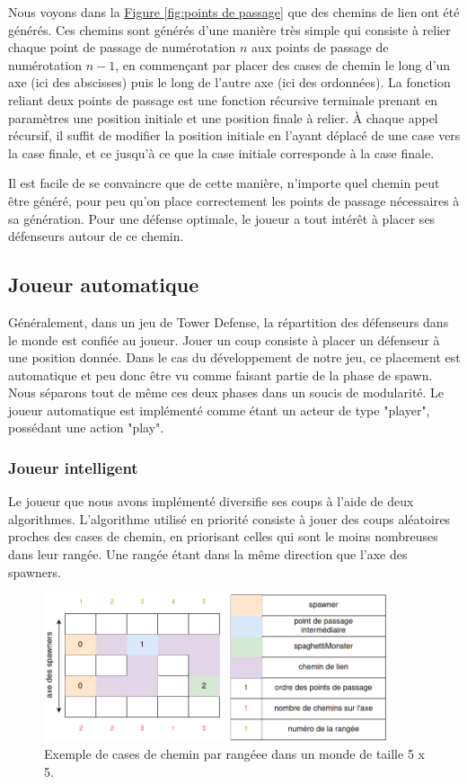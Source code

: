 \documentclass{article}
\begin{document}
Nous voyons dans la \hyperref[fig:points de passage]{Figure \ref{fig:points de passage}} que des chemins de lien ont été générés. Ces chemins sont générés d'une manière très simple qui consiste à relier chaque point de passage de numérotation $n$ aux points de passage de numérotation $n - 1$, en commençant par placer des cases de chemin le long d'un axe (ici des abscisses) puis le long de l'autre axe (ici des ordonnées). La fonction reliant deux points de passage est une fonction récursive terminale prenant en paramètres une position initiale et une position finale à relier. À chaque appel récursif, il suffit de modifier la position initiale en l'ayant déplacé de une case vers la case finale, et ce jusqu'à ce que la case initiale corresponde à la case finale.

Il est facile de se convaincre que de cette manière, n'importe quel chemin peut être généré, pour peu qu'on place correctement les points de passage nécessaires à sa génération.
Pour une défense optimale, le joueur a tout intérêt à placer ses défenseurs autour de ce chemin.

\subsection{Joueur automatique}

Généralement, dans un jeu de Tower Defense, la répartition des défenseurs dans le monde est confiée au joueur. Jouer un coup consiste à placer un défenseur à une position donnée. Dans le cas du développement de notre jeu, ce placement est automatique et peu donc être vu comme faisant partie de la phase de spawn. Nous séparons tout de même ces deux phases dans un soucis de modularité.
Le joueur automatique est implémenté comme étant un acteur de type "player", possédant une action "play".

\subsubsection{Joueur intelligent}

Le joueur que nous avons implémenté diversifie ses coups à l'aide de deux algorithmes.
L'algorithme utilisé en priorité consiste à jouer des coups aléatoires proches des cases de chemin, en priorisant celles qui sont le moins nombreuses dans leur rangée. Une rangée étant dans la même direction que l'axe des spawners.

\begin{figure}[H]
    \centering
    \includegraphics[width = 0.9\textwidth]{points_de_passage_4.png}
    \caption{Exemple de cases de chemin par rangéee dans un monde de taille 5 x 5.}
    \label{fig:points de passage play}
\end{figure}
\end{document}
